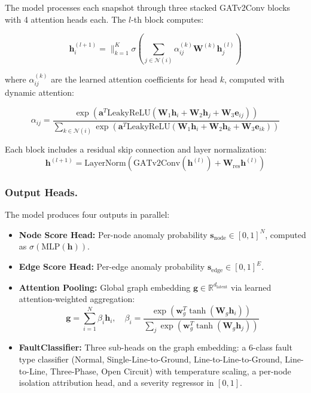 \documentclass[conference]{IEEEtran}
\begin{document}
The model processes each snapshot through three stacked GATv2Conv blocks with 4 attention heads each. The $l$-th block computes:

\begin{equation}
  \mathbf{h}_i^{(l+1)} = \|_{k=1}^K \sigma\left(\sum_{j \in \mathcal{N}(i)} \alpha_{ij}^{(k)} \mathbf{W}^{(k)} \mathbf{h}_j^{(l)}\right)
\end{equation}

where $\alpha_{ij}^{(k)}$ are the learned attention coefficients for head $k$, computed with dynamic attention:

\begin{equation}
  \alpha_{ij} = \frac{\exp(\mathbf{a}^T \text{LeakyReLU}(\mathbf{W}_1 \mathbf{h}_i + \mathbf{W}_2 \mathbf{h}_j + \mathbf{W}_3 \mathbf{e}_{ij}))}{\sum_{k \in \mathcal{N}(i)} \exp(\mathbf{a}^T \text{LeakyReLU}(\mathbf{W}_1 \mathbf{h}_i + \mathbf{W}_2 \mathbf{h}_k + \mathbf{W}_3 \mathbf{e}_{ik}))}
\end{equation}

Each block includes a residual skip connection and layer normalization:
\begin{equation}
  \mathbf{h}^{(l+1)} = \text{LayerNorm}(\text{GATv2Conv}(\mathbf{h}^{(l)}) + \mathbf{W}_{\text{res}} \mathbf{h}^{(l)})
\end{equation}

\subsubsection{Output Heads.}

The model produces four outputs in parallel:

\begin{itemize}
  \item \textbf{Node Score Head:} Per-node anomaly probability $\mathbf{s}_{\text{node}} \in [0,1]^N$, computed as $\sigma(\text{MLP}(\mathbf{h}))$.
  \item \textbf{Edge Score Head:} Per-edge anomaly probability $\mathbf{s}_{\text{edge}} \in [0,1]^E$.
  \item \textbf{Attention Pooling:} Global graph embedding $\mathbf{g} \in \mathbb{R}^{d_{\text{latent}}}$ via learned attention-weighted aggregation:
  \begin{equation}
    \mathbf{g} = \sum_{i=1}^N \beta_i \mathbf{h}_i, \quad \beta_i = \frac{\exp(\mathbf{w}_g^T \tanh(\mathbf{W}_g \mathbf{h}_i))}{\sum_j \exp(\mathbf{w}_g^T \tanh(\mathbf{W}_g \mathbf{h}_j))}
  \end{equation}
  \item \textbf{FaultClassifier:} Three sub-heads on the graph embedding: a 6-class fault type classifier (Normal, Single-Line-to-Ground, Line-to-Line-to-Ground, Line-to-Line, Three-Phase, Open Circuit) with temperature scaling, a per-node isolation attribution head, and a severity regressor in $[0,1]$.
\end{itemize}
\end{document}
